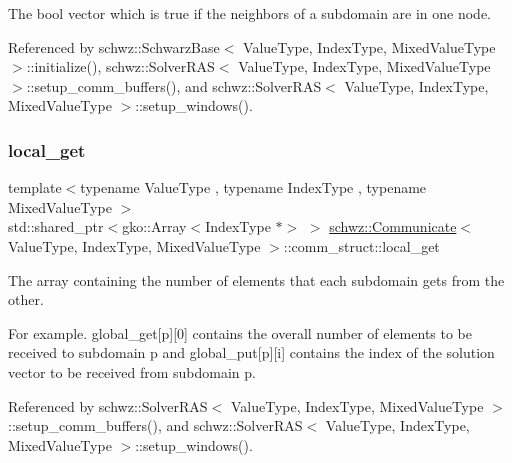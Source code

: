 The bool vector which is true if the neighbors of a subdomain are in one node. 



Referenced by schwz\+::\+Schwarz\+Base$<$ Value\+Type, Index\+Type, Mixed\+Value\+Type $>$\+::initialize(), schwz\+::\+Solver\+R\+A\+S$<$ Value\+Type, Index\+Type, Mixed\+Value\+Type $>$\+::setup\+\_\+comm\+\_\+buffers(), and schwz\+::\+Solver\+R\+A\+S$<$ Value\+Type, Index\+Type, Mixed\+Value\+Type $>$\+::setup\+\_\+windows().

\mbox{\label{structschwz_1_1Communicate_1_1comm__struct_ab4e91a457646f43106da98a58c332754}} 
\subsubsection{\texorpdfstring{local\+\_\+get}{local\_get}}
{\footnotesize\ttfamily template$<$typename Value\+Type , typename Index\+Type , typename Mixed\+Value\+Type $>$ \\
std\+::shared\+\_\+ptr$<$gko\+::\+Array$<$Index\+Type $\ast$$>$ $>$ \hyperlink{classschwz_1_1Communicate}{schwz\+::\+Communicate}$<$ Value\+Type, Index\+Type, Mixed\+Value\+Type $>$\+::comm\+\_\+struct\+::local\+\_\+get}



The array containing the number of elements that each subdomain gets from the other. 

For example. global\+\_\+get\mbox{[}p\mbox{]}\mbox{[}0\mbox{]} contains the overall number of elements to be received to subdomain p and global\+\_\+put\mbox{[}p\mbox{]}\mbox{[}i\mbox{]} contains the index of the solution vector to be received from subdomain p. 

Referenced by schwz\+::\+Solver\+R\+A\+S$<$ Value\+Type, Index\+Type, Mixed\+Value\+Type $>$\+::setup\+\_\+comm\+\_\+buffers(), and schwz\+::\+Solver\+R\+A\+S$<$ Value\+Type, Index\+Type, Mixed\+Value\+Type $>$\+::setup\+\_\+windows().

\mbox{\label{structschwz_1_1Communicate_1_1comm__struct_ace7588b81dd2aa7a84e118df8137252b}} 
